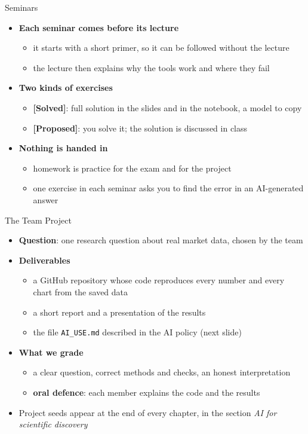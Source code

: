 \begin{frame}{Seminars}
\itemsize{\small}
\begin{itemize}
    \item \textbf{Each seminar comes before its lecture}
    \begin{itemize}
        \item it starts with a short primer, so it can be followed without the lecture
        \item the lecture then explains why the tools work and where they fail
    \end{itemize}
    \item \textbf{Two kinds of exercises}
    \begin{itemize}
        \item \textbf{[Solved]}: full solution in the slides and in the notebook, a model to copy
        \item \textbf{[Proposed]}: you solve it; the solution is discussed in class
    \end{itemize}
    \item \textbf{Nothing is handed in}
    \begin{itemize}
        \item homework is practice for the exam and for the project
        \item one exercise in each seminar asks you to find the error in an AI-generated answer
    \end{itemize}
\end{itemize}
\end{frame}

\begin{frame}{The Team Project}
\itemsize{\small}
\begin{itemize}
    \item \textbf{Question}: one research question about real market data, chosen by the team
    \item \textbf{Deliverables}
    \begin{itemize}
        \item a GitHub repository whose code reproduces every number and every chart from the saved data
        \item a short report and a presentation of the results
        \item the file \texttt{AI\_USE.md} described in the AI policy (next slide)
    \end{itemize}
    \item \textbf{What we grade}
    \begin{itemize}
        \item a clear question, correct methods and checks, an honest interpretation
        \item \textbf{oral defence}: each member explains the code and the results
    \end{itemize}
    \item Project seeds appear at the end of every chapter, in the section \emph{AI for scientific discovery}
\end{itemize}
\end{frame}

